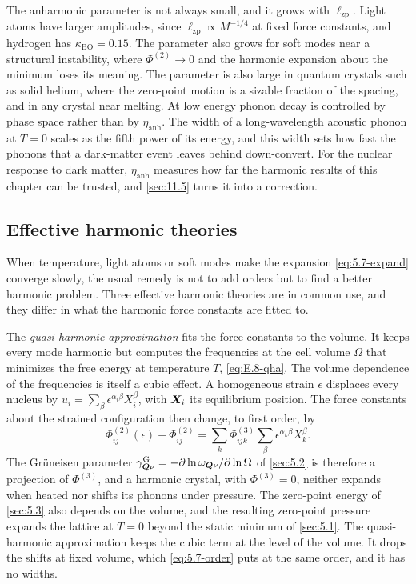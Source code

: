 The anharmonic parameter is not always small, and it grows with $\ell_{\mathrm{zp}}$. Light atoms have larger amplitudes, since $\ell_{\mathrm{zp}} \propto M^{-1/4}$ at fixed force constants, and hydrogen has $\kappa_{\mathrm{BO}} = 0.15$. The parameter also grows for soft modes near a structural instability, where $\Phi^{(2)} \to 0$ and the harmonic expansion about the minimum loses its meaning. The parameter is also large in quantum crystals such as solid helium, where the zero-point motion is a sizable fraction of the spacing, and in any crystal near melting. At low energy phonon decay is controlled by phase space rather than by $\eta_{\mathrm{anh}}$. The width of a long-wavelength acoustic phonon at $T = 0$ scales as the fifth power of its energy, and this width sets how fast the phonons that a dark-matter event leaves behind down-convert. For the nuclear response to dark matter, $\eta_{\mathrm{anh}}$ measures how far the harmonic results of this chapter can be trusted, and \cref{sec:11.5} turns it into a correction.

\subsection{Effective harmonic theories}

When temperature, light atoms or soft modes make the expansion \cref{eq:5.7-expand} converge slowly, the usual remedy is not to add orders but to find a better harmonic problem. Three effective harmonic theories are in common use, and they differ in what the harmonic force constants are fitted to.

The \emph{quasi-harmonic approximation} fits the force constants to the volume. It keeps every mode harmonic but computes the frequencies at the cell volume $\Omega$ that minimizes the free energy at temperature $T$, \cref{eq:E.8-qha}. The volume dependence of the frequencies is itself a cubic effect. A homogeneous strain $\epsilon$ displaces every nucleus by $u_i = \sum_\beta\epsilon^{\alpha_i\beta}X^\beta_i$, with $\bm{X}_i$ its equilibrium position. The force constants about the strained configuration then change, to first order, by
\begin{equation}
  \Phi^{(2)}_{ij}(\epsilon) - \Phi^{(2)}_{ij} = \sum_k\Phi^{(3)}_{ijk}\sum_\beta\epsilon^{\alpha_k\beta}X^\beta_k .
  \label{eq:5.7-strain}
\end{equation}
The Grüneisen parameter $\gamma^{\mathrm{G}}_{\bm{Q}\nu} = -\partial\ln\omega_{\bm{Q}\nu}/\partial\ln\Omega$ of \cref{sec:5.2} is therefore a projection of $\Phi^{(3)}$, and a harmonic crystal, with $\Phi^{(3)} = 0$, neither expands when heated nor shifts its phonons under pressure. The zero-point energy of \cref{sec:5.3} also depends on the volume, and the resulting zero-point pressure expands the lattice at $T = 0$ beyond the static minimum of \cref{sec:5.1}. The quasi-harmonic approximation keeps the cubic term at the level of the volume. It drops the shifts at fixed volume, which \cref{eq:5.7-order} puts at the same order, and it has no widths.

